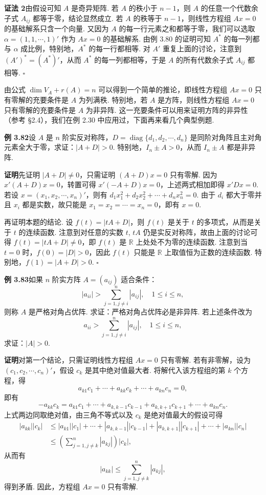 \documentclass[UTF8,12pt,a4paper,fontset=fandol]{ctexart}
\begin{document}
\noindent\textbf{证法 2}\quad 由假设可知 $A$ 是奇异矩阵. 若 $A$ 的秩小于 $n-1$，则 $A$ 的任意一个代数余子式 $A_{ij}$ 都等于零，结论显然成立. 若 $A$ 的秩等于 $n-1$，则线性方程组 $Ax=0$ 的基础解系只含一个向量. 又因为 $A$ 的每一行元素之和都等于零，我们可以选取 $\alpha=(1,1,\cdots,1)'$ 作为 $Ax=0$ 的基础解系. 由例 3.80 的证明可知 $A^*$ 的每一列都与 $\alpha$ 成比例，特别地，$A^*$ 的每一行都相等. 对 $A'$ 重复上面的讨论，注意到 $(A')^*=(A^*)'$，从而 $A^*$ 的每一列都相等，于是 $A$ 的所有代数余子式 $A_{ij}$ 都相等. $\square$

由公式 $\dim V_A+r(A)=n$ 可以得到一个简单的推论，即线性方程组 $Ax=0$ 只有零解的充要条件是 $A$ 为列满秩. 特别地，若 $A$ 是方阵，则线性方程组 $Ax=0$ 只有零解的充要条件是 $A$ 为非异阵. 这一充要条件可以用来证明方阵的非异性（参考 §2.4），我们在例 2.30 中应用过，下面再来看几个典型例题.

\noindent\textbf{例 3.82}\quad 设 $A$ 是 $n$ 阶实反对称阵，$D=\operatorname{diag}\{d_1,d_2,\cdots,d_n\}$ 是同阶对角阵且主对角元素全大于零，求证：$|A+D|>0$. 特别地，$I_n\pm A>0$，从而 $I_n\pm A$ 都是非异阵.

\noindent\textbf{证明}\quad 先证明 $|A+D|\ne 0$，只需证明 $(A+D)x=0$ 只有零解. 因为 $x'(A+D)x=0$，转置可得 $x'(-A+D)x=0$，上述两式相加即得 $x'Dx=0$. 若设 $x=(x_1,x_2,\cdots,x_n)'$，则有 $d_1x_1^2+d_2x_2^2+\cdots+d_nx_n^2=0$. 由于 $d_i$ 都大于零并且 $x_i$ 都是实数，故只能是 $x_1=x_2=\cdots=x_n=0$，即有 $x=0$.

再证明本题的结论. 设 $f(t)=|tA+D|$，则 $f(t)$ 是关于 $t$ 的多项式，从而是关于 $t$ 的连续函数. 注意到对任意的实数 $t$, $tA$ 仍是实反对称阵，故由上面的讨论可得 $f(t)=|tA+D|\ne 0$，即 $f(t)$ 是 $\mathbb{R}$ 上处处不为零的连续函数. 注意到当 $t=0$ 时，$f(0)=|D|>0$，因此 $f(t)$ 只能是 $\mathbb{R}$ 上取值恒为正数的连续函数. 特别地，$f(1)=|A+D|>0$. $\square$

\noindent\textbf{例 3.83}\quad 如果 $n$ 阶实方阵 $A=(a_{ij})$ 适合条件：
\[
|a_{ii}|>\sum_{j=1,j\ne i}^n |a_{ij}|,\quad 1\le i\le n,
\]
则称 $A$ 是严格对角占优阵. 求证：严格对角占优阵必是非异阵. 若上述条件改为
\[
a_{ii}>\sum_{j=1,j\ne i}^n |a_{ij}|,\quad 1\le i\le n,
\]
求证：$|A|>0$.

\noindent\textbf{证明}\quad 对第一个结论，只需证明线性方程组 $Ax=0$ 只有零解. 若有非零解，设为 $(c_1,c_2,\cdots,c_n)'$，假设 $c_k$ 是其中绝对值最大者. 将解代入该方程组的第 $k$ 个方程，得
\[
a_{k1}c_1+\cdots+a_{kk}c_k+\cdots+a_{kn}c_n=0,
\]
即有
\[
-a_{kk}c_k=a_{k1}c_1+\cdots+a_{k,k-1}c_{k-1}+a_{k,k+1}c_{k+1}+\cdots+a_{kn}c_n.
\]
上式两边同取绝对值，由三角不等式以及 $c_k$ 是绝对值最大的假设可得
\[
\begin{aligned}
|a_{kk}||c_k|&\le |a_{k1}||c_1|+\cdots+|a_{k,k-1}||c_{k-1}|+|a_{k,k+1}||c_{k+1}|+\cdots+|a_{kn}||c_n|\\
&\le \left(\sum_{j=1,j\ne k}^n |a_{kj}|\right)|c_k|,
\end{aligned}
\]
从而有
\[
|a_{kk}|\le \sum_{j=1,j\ne k}^n |a_{kj}|,
\]
得到矛盾. 因此，方程组 $Ax=0$ 只有零解.
\end{document}
